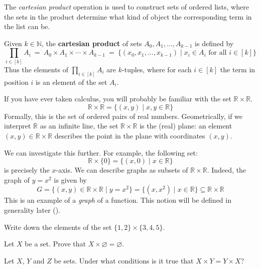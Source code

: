 The \textit{cartesian product} operation is used to construct sets of ordered lists, where the sets in the product determine what kind of object the corresponding term in the list can be.

\begin{definition}
\label{defCartesianProduct}
Given $k \in \mathbb{N}$, the \textbf{cartesian product} of sets $A_0, A_1, \dots, A_{k-1}$ is defined by
\[ \prod_{i \in [k]} A_i ~=~ A_0 \times A_1 \times \cdots \times A_{k-1} ~=~ \{ (x_0,x_1,\dots,x_{k-1}) \mid x_i \in A_i \text{ for all } i \in [k] \} \]
Thus the elements of $\displaystyle \prod_{i \in [k]} A_i$ are $k$-tuples, where for each $i \in [k]$ the term in position $i$ is an element of the set $A_i$.
\end{definition}

\begin{example}
If you have ever taken calculus, you will probably be familiar with the set $\mathbb{R} \times \mathbb{R}$.
\[ \mathbb{R} \times \mathbb{R} = \{ (x,y) \mid x,y \in \mathbb{R} \} \]
Formally, this is the set of ordered pairs of real numbers. Geometrically, if we interpret $\mathbb{R}$ as an infinite line, the set $\mathbb{R} \times \mathbb{R}$ is the (real) plane: an element $(x,y) \in \mathbb{R} \times \mathbb{R}$ describes the point in the plane with coordinates $(x,y)$.

We can investigate this further. For example, the following set:
\[ \mathbb{R} \times \{ 0 \} = \{ (x,0) \mid x \in \mathbb{R} \} \]
is precisely the $x$-axis. We can describe graphs as subsets of $\mathbb{R} \times \mathbb{R}$. Indeed, the graph of $y=x^2$ is given by
\[ G = \{ (x,y) \in \mathbb{R} \times \mathbb{R} \mid y = x^2 \} = \{ (x,x^2) \mid x \in \mathbb{R} \} \subseteq \mathbb{R} \times \mathbb{R} \]
This is an example of a \textit{graph} of a function. This notion will be defined in generality later ().
\end{example}

\begin{exercise}
Write down the elements of the set $\{ 1, 2 \} \times \{ 3, 4, 5 \}$.
\end{exercise}

\begin{exercise}
Let $X$ be a set. Prove that $X \times \varnothing = \varnothing$.
\end{exercise}

\begin{exercise}
\label{exCartesianProductNotCommutative}
Let $X$, $Y$ and $Z$ be sets. Under what conditions is it true that $X \times Y = Y \times X$?
\end{exercise}

